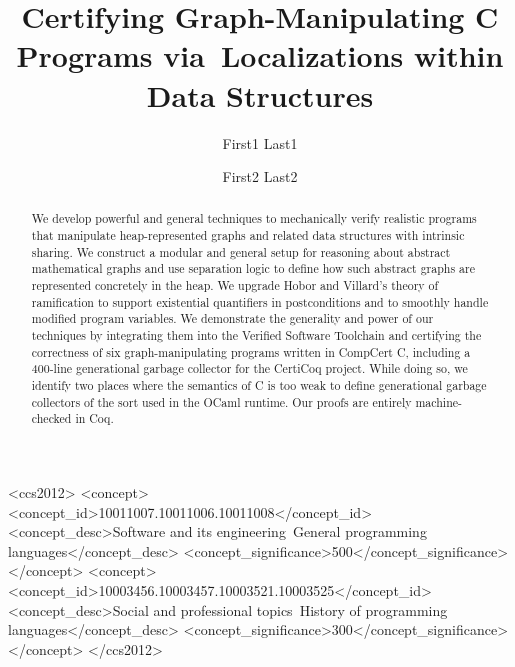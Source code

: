 \documentclass[acmsmall,review,anonymous]{acmart}\settopmatter{printfolios=true,printccs=false,printacmref=false}
\begin{document}
\title[Certifying Graph-Manipulating Programs]
{Certifying Graph-Manipulating C Programs via~Localizations within Data Structures}





\author{First1 Last1}
                       

\author{First2 Last2}
                       
         


\begin{abstract}
We develop powerful and general techniques to mechanically verify realistic programs that
manipulate heap-represented graphs and related data structures with intrinsic sharing.
We construct a modular and general setup for reasoning about abstract mathematical graphs
and use separation logic to define how such abstract graphs are represented concretely in
the heap. We upgrade Hobor and Villard's theory of ramification to support existential
quantifiers in postconditions and to smoothly handle modified program variables.
We demonstrate the generality
and power of our techniques by integrating them into the Verified Software Toolchain and
certifying the correctness of six graph-manipulating programs written in
CompCert C, including
a 400-line generational garbage collector for the CertiCoq project.
While doing so, we identify
two places where the semantics of C is too weak to define generational
garbage collectors of the
sort used in the OCaml runtime.  Our proofs are entirely machine-checked in Coq.
\end{abstract}

\begin{CCSXML}
<ccs2012>
<concept>
<concept_id>10011007.10011006.10011008</concept_id>
<concept_desc>Software and its engineering~General programming languages</concept_desc>
<concept_significance>500</concept_significance>
</concept>
<concept>
<concept_id>10003456.10003457.10003521.10003525</concept_id>
<concept_desc>Social and professional topics~History of programming languages</concept_desc>
<concept_significance>300</concept_significance>
</concept>
</ccs2012>
\end{CCSXML}
\end{document}
